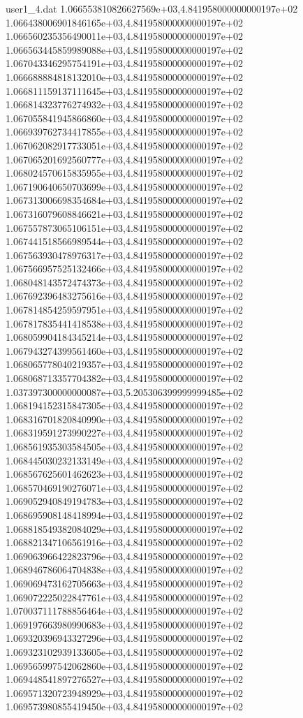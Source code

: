 \begin{filecontents}{user1_4.dat}
1.066553810826627569e+03,4.841958000000000197e+02
1.066438006901846165e+03,4.841958000000000197e+02
1.066560235356490011e+03,4.841958000000000197e+02
1.066563445859989088e+03,4.841958000000000197e+02
1.067043346295754191e+03,4.841958000000000197e+02
1.066688884818132010e+03,4.841958000000000197e+02
1.066811159137111645e+03,4.841958000000000197e+02
1.066814323776274932e+03,4.841958000000000197e+02
1.067055841945866860e+03,4.841958000000000197e+02
1.066939762734417855e+03,4.841958000000000197e+02
1.067062082917733051e+03,4.841958000000000197e+02
1.067065201692560777e+03,4.841958000000000197e+02
1.068024570615835955e+03,4.841958000000000197e+02
1.067190640650703699e+03,4.841958000000000197e+02
1.067313006698354684e+03,4.841958000000000197e+02
1.067316079608846621e+03,4.841958000000000197e+02
1.067557873065106151e+03,4.841958000000000197e+02
1.067441518566989544e+03,4.841958000000000197e+02
1.067563930478976317e+03,4.841958000000000197e+02
1.067566957525132466e+03,4.841958000000000197e+02
1.068048143572474373e+03,4.841958000000000197e+02
1.067692396483275616e+03,4.841958000000000197e+02
1.067814854259597951e+03,4.841958000000000197e+02
1.067817835441418538e+03,4.841958000000000197e+02
1.068059904184345214e+03,4.841958000000000197e+02
1.067943274399561460e+03,4.841958000000000197e+02
1.068065778040219357e+03,4.841958000000000197e+02
1.068068713357704382e+03,4.841958000000000197e+02
1.037397300000000087e+03,5.205306399999999485e+02
1.068194152315847305e+03,4.841958000000000197e+02
1.068316701820840990e+03,4.841958000000000197e+02
1.068319591273990227e+03,4.841958000000000197e+02
1.068561935303584505e+03,4.841958000000000197e+02
1.068445030232133149e+03,4.841958000000000197e+02
1.068567625601462623e+03,4.841958000000000197e+02
1.068570469190276071e+03,4.841958000000000197e+02
1.069052940849194783e+03,4.841958000000000197e+02
1.068695908148418994e+03,4.841958000000000197e+02
1.068818549382084029e+03,4.841958000000000197e+02
1.068821347106561916e+03,4.841958000000000197e+02
1.069063966422823796e+03,4.841958000000000197e+02
1.068946786064704838e+03,4.841958000000000197e+02
1.069069473162705663e+03,4.841958000000000197e+02
1.069072225022847761e+03,4.841958000000000197e+02
1.070037111788856464e+03,4.841958000000000197e+02
1.069197663980990683e+03,4.841958000000000197e+02
1.069320396943327296e+03,4.841958000000000197e+02
1.069323102939133605e+03,4.841958000000000197e+02
1.069565997542062860e+03,4.841958000000000197e+02
1.069448541897276527e+03,4.841958000000000197e+02
1.069571320723948929e+03,4.841958000000000197e+02
1.069573980855419450e+03,4.841958000000000197e+02

\end{filecontents}
